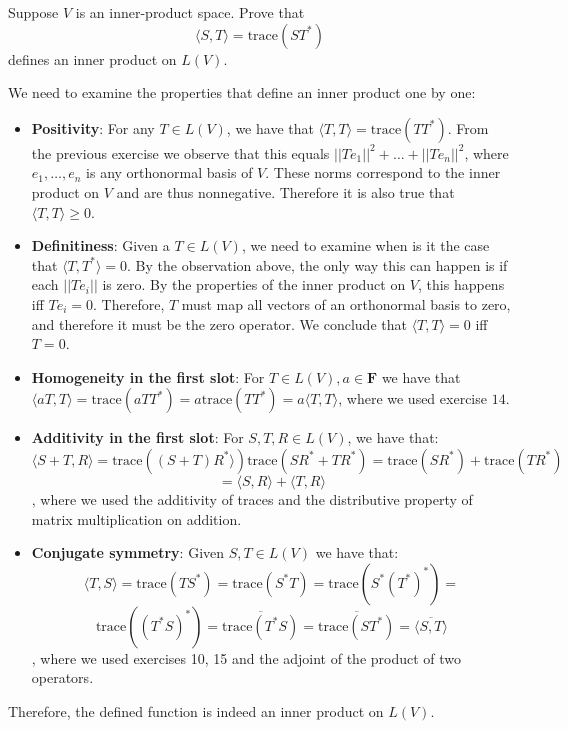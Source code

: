 \begin{exercise}{19}
    Suppose $V$ is an inner-product space. Prove that
    $$\langle S, T \rangle = \text{trace} (ST^*)$$
    defines an inner product on $L(V)$.
\end{exercise}

\begin{solution}

    We need to examine the properties that define an inner product one by one:
    \begin{itemize}
        \item \textbf{Positivity}: For any $T \in L(V)$, we have that $\langle T, T \rangle = \text{trace} (TT^*)$. From the previous exercise we observe that this equals $\lvert \lvert T e_1 \rvert \rvert^2 + \ldots + \lvert \lvert T e_n \rvert \rvert^2$, where $e_1, \ldots, e_n$ is any orthonormal basis of $V$. These norms correspond to the inner product on $V$ and are thus nonnegative. Therefore it is also true that $\langle T, T \rangle \geq 0$.
        \item \textbf{Definitiness}: Given a $T \in L(V)$, we need to examine when is it the case that $\langle T, T^* \rangle = 0$. By the observation above, the only way this can happen is if each $\lvert \vert T e_i \rvert \rvert$ is zero. By the properties of the inner product on $V$, this happens iff $T e_i = 0$. Therefore, $T$ must map all vectors of an orthonormal basis to zero, and therefore it must be the zero operator. We conclude that $\langle T, T \rangle = 0$ iff $T = 0$.
        \item  \textbf{Homogeneity in the first slot}: For $T \in L(V), a \in \mathbf{F}$ we have that $\langle a T, T \rangle = \text{trace}(a TT^*) = a \text{trace} (TT^*) = a \langle T, T \rangle$, where we used exercise $14$.
        \item \textbf{Additivity in the first slot}: For $S, T, R \in L(V)$, we have that:
        $$\langle S + T, R \rangle = \text{trace}((S+T)R^* \rangle) \text{trace}(SR^* + TR^*) = \text{trace}(SR^*) + \text{trace}(TR^*)$$
        $$= \langle S, R \rangle + \langle T, R \rangle$$
        , where we used the additivity of traces and the distributive property of matrix multiplication on addition.
        \item \textbf{Conjugate symmetry}: Given $S, T \in L(V)$ we have that:
        $$\langle T, S \rangle = \text{trace}(TS^*) = \text{trace}(S^*T) = \text{trace}(S^*(T^*)^*) = $$
        $$\text{trace} ((T^*S)^*) = \overline{\text{trace} (T^*S)} = \overline{\text{trace} (ST^*)} = \overline{\langle S, T \rangle}$$
        , where we used exercises 10, 15 and the adjoint of the product of two operators.
    \end{itemize}
    Therefore, the defined function is indeed an inner product on $L(V)$.
\end{solution}


